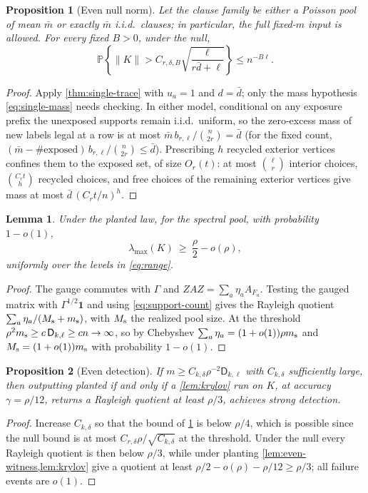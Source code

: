 \documentclass[11pt]{article}
\newtheorem{proposition}[proposition]{Proposition}
\newtheorem{lemma}[lemma]{Lemma}
\theoremstyle{definition}
\theoremstyle{remark}
\newcommand{\bbP}{\mathbb P}
\newcommand{\1}{\mathbf 1}
\newcommand{\bd}{\bar d}
\newcommand{\Dkl}{\mathsf D_{k,\ell}}
\numberwithin{equation}{section}
\begin{document}
\begin{proposition}[Even null norm]\label{prop:even-null}
Let the clause family be either a Poisson pool of mean $\bar m$ or
exactly $\bar m$ i.i.d.\ clauses; in particular, the full fixed-$m$ input
is allowed.  For every fixed $B>0$, under the null,
\begin{equation}\label{eq:even-null}
 \bbP\left\{
 \|K\|>C_{r,\delta,B}\sqrt{\frac{\ell}{r\bd+\ell}}
 \right\}\le n^{-B\ell}.
\end{equation}
\end{proposition}
\begin{proof}
Apply \cref{thm:single-trace} with $u_a=1$ and $d=\bd$; only the mass
hypothesis \cref{eq:single-mass} needs checking.  In either model,
conditional on any exposure prefix the unexposed supports remain
i.i.d.\ uniform, so the zero-excess mass of new labels legal at a row
is at most $\bar m\,b_{r,\ell}/\binom n{2r}=\bd$ (for the fixed count,
$(\bar m-\#\text{exposed})\,b_{r,\ell}/\binom n{2r}\le\bd$).
Prescribing $h$ recycled exterior vertices confines them to the exposed
set, of size $O_r(t)$: at most $\binom\ell r$ interior choices,
$\binom{C_rt}h$ recycled choices, and free choices of the remaining
exterior vertices give mass at most $\bd\,(C_rt/n)^h$.
\end{proof}

\begin{lemma}\label{lem:even-witness}
Under the planted law, for the spectral pool, with probability $1-o(1)$,
\begin{equation}\label{eq:even-witness}
 \lambda_{\max}(K)\ \ge\ \frac\rho2-o(\rho),
\end{equation}
uniformly over the levels in \cref{eq:range}.
\end{lemma}
\begin{proof}
The gauge commutes with $\Gamma$ and $ZAZ=\sum_a\eta_aA_{F_a}$.
Testing the gauged matrix with $\Gamma^{1/2}\1$ and using
\cref{eq:support-count} gives the Rayleigh quotient
$\sum_a\eta_a/(M_{\rm s}+m_{\rm s})$, with $M_{\rm s}$ the realized
pool size.  At the threshold
$\rho^2m_{\rm s}\ge c\,\Dkl\ge cn\to\infty$, so by Chebyshev
$\sum_a\eta_a=(1+o(1))\rho m_{\rm s}$ and
$M_{\rm s}=(1+o(1))m_{\rm s}$ with probability $1-o(1)$.
\end{proof}

\begin{proposition}[Even detection]\label{prop:even-detection}
If $m\ge C_{k,\delta}\rho^{-2}\Dkl$ with $C_{k,\delta}$ sufficiently
large, then outputting \textsf{planted} if and only if a
\cref{lem:krylov} run on $K$, at accuracy $\gamma=\rho/12$, returns a
Rayleigh quotient at least $\rho/3$, achieves strong detection.
\end{proposition}
\begin{proof}
Increase $C_{k,\delta}$ so that the bound of \cref{prop:even-null} is
below $\rho/4$, which is possible since the null bound is at most
$C_{r,\delta}\rho/\sqrt{C_{k,\delta}}$ at the threshold.  Under the
null every Rayleigh quotient is then below $\rho/3$, while under
planting \cref{lem:even-witness,lem:krylov} give a quotient at least
$\rho/2-o(\rho)-\rho/12\ge\rho/3$; all failure events are $o(1)$.
\end{proof}
\end{document}
